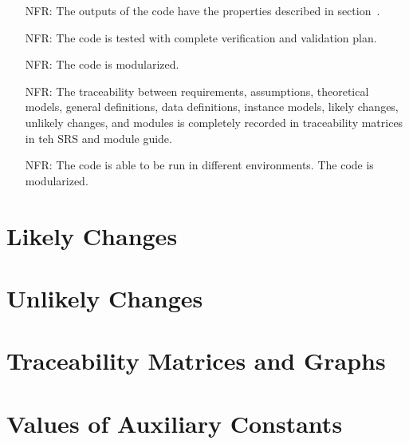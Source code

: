\documentclass[12pt]{article}
\newcounter{reqnum} %
\begin{document}
\noindent \begin{itemize}

\item[NFR\refstepcounter{reqnum}\thereqnum \label{NFR_Correct}:] 
The outputs of the code have the properties described in section~.
\item[NFR\refstepcounter{reqnum}\thereqnum \label{NFR_Verifiable}:]  
The code is tested with complete verification and validation plan.
\item[NFR\refstepcounter{reqnum}\thereqnum \label{R_Reusable}:]
The code is modularized. 
\item[NFR\refstepcounter{reqnum}\thereqnum \label{R_Maintainable}:]
The traceability between requirements, assumptions, theoretical models, general definitions, data definitions, instance models, likely changes, unlikely changes, and modules is completely recorded in traceability matrices in teh SRS and module guide. 
\item[NFR\refstepcounter{reqnum}\thereqnum \label{R_Portable}:]
The code is able to be run in different environments. 
The code is modularized.
\end{itemize}

\section{Likely Changes}\label{sec_likelyChanges}

\section{Unlikely Changes}\label{sec_unlikelyChanges}


\section{Traceability Matrices and Graphs}\label{sec_traceMatricesGraph}

\section{Values of Auxiliary Constants}\label{sec_auxConst}
\end{document}
